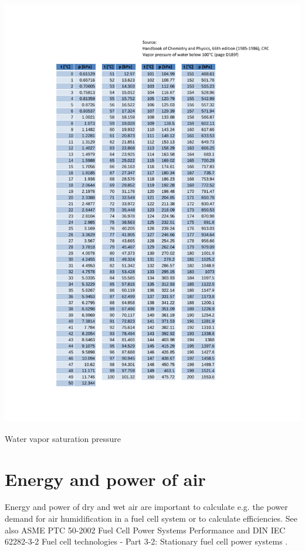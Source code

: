 \documentclass[11pt,a4paper,english,twoside]{scrreprt}
\begin{document}
\begin{table}
  \centering
  \includegraphics*[height=\textheight,angle=0]{FCF_Tab_pws.pdf}
  \caption[Water vapor saturation pressure]{Water vapor saturation pressure}
  \label{table:pws}
\end{table}


\newpage


\section{Energy and power of air}
\label{chap:Energy and power of air}

Energy and power of dry and wet air are important to calculate e.g. the power demand for air humidification in a fuel cell system or to calculate efficiencies. See also ASME PTC 50-2002 Fuel Cell Power Systems Performance \cite{ASME} and DIN IEC 62282-3-2 Fuel cell technologies - Part 3-2: Stationary fuel cell power systems \cite{DIN_62282-3-2}.
\end{document}

